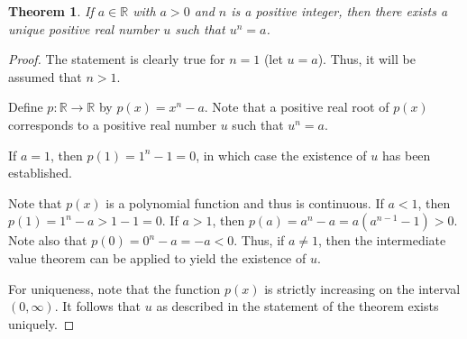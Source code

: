 \documentclass[12pt]{article}
\newtheorem*{thm*}{Theorem}
\begin{document}
\begin{thm*}
If $a \in \mathbb{R}$ with $a>0$ and $n$ is a positive integer, then there exists a unique positive real number $u$ such that $u^n=a$.
\end{thm*}

\begin{proof}
The statement is clearly true for $n=1$ (let $u=a$).  Thus, it will be assumed that $n>1$.

Define $p \colon \mathbb{R} \to \mathbb{R}$ by $p(x)=x^n-a$.  Note that a positive real root of $p(x)$ corresponds to a positive real number $u$ such that $u^n=a$.

If $a=1$, then $p(1)=1^n-1=0$, in which case the existence of $u$ has been established.

Note that $p(x)$ is a polynomial function and thus is continuous.  If $a<1$, then $p(1)=1^n-a>1-1=0$.  If $a>1$, then $p(a)=a^n-a=a(a^{n-1}-1)>0$.  Note also that $p(0)=0^n-a=-a<0$.  Thus, if $a \neq 1$, then the intermediate value theorem can be applied to yield the existence of $u$.

For uniqueness, note that the function $p(x)$ is strictly increasing on the interval $(0, \infty)$.  It follows that $u$ as described in the statement of the theorem exists uniquely.
\end{proof}
\end{document}
